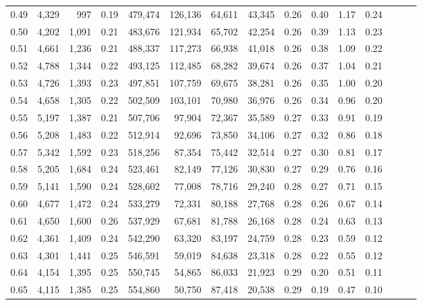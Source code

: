 \begin{tabular}{rrrrrrrrrrrrrrr}
0.49 &   4,329 &    997 &  0.19 &  479,474 &  126,136 &   64,611 &   43,345 &  0.26 &  0.40 &  1.17 &      0.24 \\
0.50 &   4,202 &  1,091 &  0.21 &  483,676 &  121,934 &   65,702 &   42,254 &  0.26 &  0.39 &  1.13 &      0.23 \\
0.51 &   4,661 &  1,236 &  0.21 &  488,337 &  117,273 &   66,938 &   41,018 &  0.26 &  0.38 &  1.09 &      0.22 \\
0.52 &   4,788 &  1,344 &  0.22 &  493,125 &  112,485 &   68,282 &   39,674 &  0.26 &  0.37 &  1.04 &      0.21 \\
0.53 &   4,726 &  1,393 &  0.23 &  497,851 &  107,759 &   69,675 &   38,281 &  0.26 &  0.35 &  1.00 &      0.20 \\
0.54 &   4,658 &  1,305 &  0.22 &  502,509 &  103,101 &   70,980 &   36,976 &  0.26 &  0.34 &  0.96 &      0.20 \\
0.55 &   5,197 &  1,387 &  0.21 &  507,706 &   97,904 &   72,367 &   35,589 &  0.27 &  0.33 &  0.91 &      0.19 \\
0.56 &   5,208 &  1,483 &  0.22 &  512,914 &   92,696 &   73,850 &   34,106 &  0.27 &  0.32 &  0.86 &      0.18 \\
0.57 &   5,342 &  1,592 &  0.23 &  518,256 &   87,354 &   75,442 &   32,514 &  0.27 &  0.30 &  0.81 &      0.17 \\
0.58 &   5,205 &  1,684 &  0.24 &  523,461 &   82,149 &   77,126 &   30,830 &  0.27 &  0.29 &  0.76 &      0.16 \\
0.59 &   5,141 &  1,590 &  0.24 &  528,602 &   77,008 &   78,716 &   29,240 &  0.28 &  0.27 &  0.71 &      0.15 \\
0.60 &   4,677 &  1,472 &  0.24 &  533,279 &   72,331 &   80,188 &   27,768 &  0.28 &  0.26 &  0.67 &      0.14 \\
0.61 &   4,650 &  1,600 &  0.26 &  537,929 &   67,681 &   81,788 &   26,168 &  0.28 &  0.24 &  0.63 &      0.13 \\
0.62 &   4,361 &  1,409 &  0.24 &  542,290 &   63,320 &   83,197 &   24,759 &  0.28 &  0.23 &  0.59 &      0.12 \\
0.63 &   4,301 &  1,441 &  0.25 &  546,591 &   59,019 &   84,638 &   23,318 &  0.28 &  0.22 &  0.55 &      0.12 \\
0.64 &   4,154 &  1,395 &  0.25 &  550,745 &   54,865 &   86,033 &   21,923 &  0.29 &  0.20 &  0.51 &      0.11 \\
0.65 &   4,115 &  1,385 &  0.25 &  554,860 &   50,750 &   87,418 &   20,538 &  0.29 &  0.19 &  0.47 &      0.10 \\

\end{tabular}
